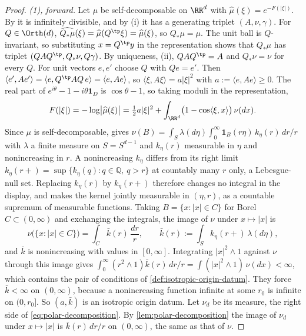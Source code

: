 \begin{proof}
\leanok
\emph{(1), forward.} Let $\mu$ be self-decomposable on $\RR^d$ with
$\widehat\mu(\xi) = e^{-F(|\xi|)}$. By  it is infinitely divisible, and by (i)
it has a generating triplet $(A,\nu,\gamma)$. For $Q \in \Orth(d)$,
$\widehat{Q_*\mu}(\xi) = \widehat\mu(Q^{\tp}\xi) = \widehat\mu(\xi)$, so $Q_*\mu = \mu$. The
unit ball is $Q$-invariant, so substituting $x = Q^{\tp}y$ in the representation shows that
$Q_*\mu$ has triplet $(QAQ^{\tp}, Q_*\nu, Q\gamma)$. By uniqueness, (ii),
$QAQ^{\tp} = A$ and $Q_*\nu = \nu$ for every $Q$. For unit vectors $e, e'$ choose $Q$ with
$Qe = e'$. Then $\langle e',Ae'\rangle = \langle e, Q^{\tp}AQ\,e\rangle = \langle e,Ae\rangle$, so
$\langle\xi,A\xi\rangle = a|\xi|^2$ with $a := \langle e,Ae\rangle \ge 0$. The real part of
$e^{i\theta} - 1 - i\theta\mathbf 1_D$ is $\cos\theta - 1$, so taking moduli in the representation,
\[
  F(|\xi|) = -\log\bigl|\widehat\mu(\xi)\bigr|
   = \tfrac12 a|\xi|^2 + \int_{\RR^d}\bigl(1 - \cos\langle\xi,x\rangle\bigr)\,\nu(dx) .
\]
Since $\mu$ is self-decomposable,  gives $\nu(B) = \int_{S}\lambda(d\eta)\int_0^\infty
\mathbf 1_B(r\eta)\,k_\eta(r)\,dr/r$ with $\lambda$ a finite measure on $S = S^{d-1}$ and
$k_\eta(r)$ measurable in $\eta$ and nonincreasing in $r$.
A nonincreasing $k_\eta$ differs from its right limit
$k_\eta(r+) = \sup\{k_\eta(q) : q \in \mathbb Q,\ q > r\}$ at countably many $r$ only, a
Lebesgue-null set. Replacing $k_\eta(r)$ by $k_\eta(r+)$ therefore changes no integral in the
display, and makes the kernel jointly measurable in $(\eta,r)$, as a countable supremum of
measurable functions. Taking $B = \{x : |x| \in C\}$ for Borel $C \subset (0,\infty)$ and
exchanging the integrals, the image of $\nu$ under $x \mapsto |x|$ is
\[
  \nu\bigl(\{x : |x| \in C\}\bigr) = \int_C \bar k(r)\,\frac{dr}{r} ,
  \qquad \bar k(r) := \int_S k_\eta(r+)\,\lambda(d\eta) ,
\]
and $\bar k$ is nonincreasing with values in $[0,\infty]$. Integrating $|x|^2 \wedge 1$ against
$\nu$ through this image gives
$\int_0^\infty(r^2 \wedge 1)\bar k(r)\,dr/r = \int(|x|^2 \wedge 1)\,\nu(dx) < \infty$, which
contains the pair of conditions of \ref{def:isotropic-origin-datum}. They force $\bar k < \infty$
on $(0,\infty)$, because a nonincreasing function infinite at some $r_0$ is infinite on $(0,r_0]$.
So $(a, \bar k)$ is an isotropic origin datum. Let $\nu_d$ be its \Levy{} measure, the right side
of \ref{eq:polar-decomposition}. By \ref{lem:polar-decomposition} the image of $\nu_d$ under
$x \mapsto |x|$ is $\bar k(r)\,dr/r$ on $(0,\infty)$, the same as that of $\nu$.


\end{proof}
